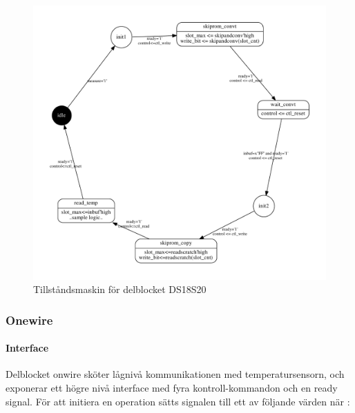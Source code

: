 \begin{figure}[H]
	\centering
	\includegraphics[width=\textwidth]{ds1820_state.pdf}
	\caption{Tillståndsmaskin för delblocket DS18S20}
	\label{fig:ds18s20_fsm}
\end{figure}



\subsubsection{Onewire}\label{sec:onewire}
\paragraph{Interface}
Delblocket onwire sköter lågnivå kommunikationen med temperatursensorn, och exponerar ett högre nivå interface med fyra kontroll-kommandon och en ready signal. För att initiera en operation sätts  signalen till ett av följande värden när :

